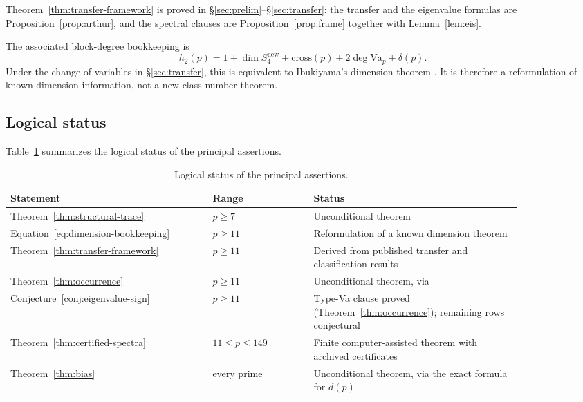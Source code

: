 \documentclass[10pt,a4paper]{amsart}
\newcommand{\Va}{\mathrm{Va}}
\newcommand{\snew}{S^{\mathrm{new}}}
\providecommand{\Va}{\mathrm{Va}}
\providecommand{\snew}{S^{\mathrm{new}}}
\begin{document}
	\noindent Theorem~\ref{thm:transfer-framework} is proved in
	\S\ref{sec:prelim}--\S\ref{sec:transfer}: the transfer and the eigenvalue
	formulas are Proposition~\ref{prop:arthur}, and the spectral clauses are
	Proposition~\ref{prop:frame} together with Lemma~\ref{lem:eis}.
	
	The associated block-degree bookkeeping is
	\begin{equation}\label{eq:dimension-bookkeeping}
		h_2(p)=1+\dim\snew_4+\mathrm{cross}(p)+2\deg\Va_p+\delta(p).
	\end{equation}
	Under the change of variables in \S\ref{sec:transfer}, this is equivalent
	to Ibukiyama's dimension theorem \cite[Thm.~3.1]{Ibukiyama2018conj}. It is
	therefore a reformulation of known dimension information, not a new
	class-number theorem.
	
	\subsection{Logical status}
	Table~\ref{tab:logical-status} summarizes the logical status of the
	principal assertions.
	
	\begin{table}[ht]
		\centering
		\begin{tabular}{@{}p{0.34\linewidth}p{0.17\linewidth}p{0.35\linewidth}@{}}
			\toprule
			Statement & Range & Status \\
			\midrule
			Theorem~\ref{thm:structural-trace} & $p\ge7$ & Unconditional theorem \\
			Equation~\eqref{eq:dimension-bookkeeping} & $p\ge11$ & Reformulation of a known dimension theorem \\
			Theorem~\ref{thm:transfer-framework} & $p\ge11$ & Derived from published transfer and classification results \\
			Theorem~\ref{thm:occurrence} & $p\ge11$ & Unconditional theorem, via \cite[Thm.~11.4]{RoesnerWeissauer2021} \\
			Conjecture~\ref{conj:eigenvalue-sign} & $p\ge11$ & Type-Va clause proved (Theorem~\ref{thm:occurrence}); remaining rows conjectural \\
			Theorem~\ref{thm:certified-spectra} & $11\le p\le149$ & Finite computer-assisted theorem with archived certificates \\
			Theorem~\ref{thm:bias} & every prime & Unconditional theorem, via the exact formula for $d(p)$ \\
			\bottomrule
		\end{tabular}
		\caption{Logical status of the principal assertions.}
		\label{tab:logical-status}
	\end{table}
	
\end{document}
